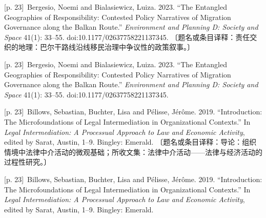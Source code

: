\documentclass[10pt,a4paper]{article}
\begin{document}
\noindent\begin{minipage}{\textwidth}\begin{minipage}[t]{\dimexpr.5\textwidth-4mm\relax}{\scriptsize\color{gray} [p. 23]}\ Bergesio, Noemi and Bialasiewicz, Luiza. 2023. “The Entangled Geographies of Responsibility: Contested Policy Narratives of Migration Governance along the Balkan Route.” \textit{Environment and Planning D: Society and Space} 41(1): 33–55. doi:10.1177/02637758221137345. 〔题名或条目译释：责任交织的地理：巴尔干路线沿线移民治理中争议性的政策叙事。〕\par\end{minipage}\hfill\begin{minipage}[t]{\dimexpr.5\textwidth-4mm\relax}{\scriptsize\color{gray} [p. 23]}\ Bergesio, Noemi and Bialasiewicz, Luiza. 2023. “The Entangled Geographies of Responsibility: Contested Policy Narratives of Migration Governance along the Balkan Route.” \textit{Environment and Planning D: Society and Space} 41(1): 33–55. doi:10.1177/02637758221137345.\par\end{minipage}\end{minipage}\par
\noindent\begin{minipage}{\textwidth}\begin{minipage}[t]{\dimexpr.5\textwidth-4mm\relax}{\scriptsize\color{gray} [p. 23]}\ Billows, Sebastian, Buchter, Lisa and Pélisse, Jérôme. 2019. “Introduction: The Microfoundations of Legal Intermediation in Organizational Contexts.” In \textit{Legal Intermediation: A Processual Approach to Law and Economic Activity}, edited by Sarat, Austin, 1–9. Bingley: Emerald. 〔题名或条目译释：导论：组织情境中法律中介活动的微观基础；所收文集：法律中介活动——法律与经济活动的过程性研究。〕\par\end{minipage}\hfill\begin{minipage}[t]{\dimexpr.5\textwidth-4mm\relax}{\scriptsize\color{gray} [p. 23]}\ Billows, Sebastian, Buchter, Lisa and Pélisse, Jérôme. 2019. “Introduction: The Microfoundations of Legal Intermediation in Organizational Contexts.” In \textit{Legal Intermediation: A Processual Approach to Law and Economic Activity}, edited by Sarat, Austin, 1–9. Bingley: Emerald.\par\end{minipage}\end{minipage}\par
\end{document}
